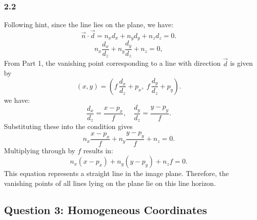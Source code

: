 \documentclass{article}
\begin{document}
\subsubsection*{2.2}
Following hint, since the line lies on the plane, we have:
\[
\vec{n} \cdot \vec{d} = n_x d_x + n_y d_y + n_z d_z = 0.
\]
\[
n_x \frac{d_x}{d_z} + n_y \frac{d_y}{d_z} + n_z = 0,
\]
From Part 1, the vanishing point corresponding to a line with direction \(\vec{d}\) is given by
\[
(x, y) = \left(f\,\frac{d_x}{d_z} + p_x,\; f\,\frac{d_y}{d_z} + p_y\right).
\]
we have:
\[
\frac{d_x}{d_z} = \frac{x - p_x}{f}, \quad \frac{d_y}{d_z} = \frac{y - p_y}{f}.
\]
Substituting these into the condition gives
\[
n_x \frac{x - p_x}{f} + n_y \frac{y - p_y}{f} + n_z = 0.
\]
Multiplying through by \(f\) results in:
\[
n_x (x - p_x) + n_y (y - p_y) + n_z f = 0.
\]
This equation represents a straight line in the image plane. Therefore, the vanishing points of all lines lying on the plane lie on this line horizon. 


\newpage
\subsection*{Question 3: Homogeneous Coordinates}
\end{document}
